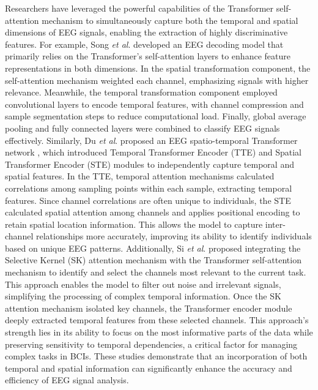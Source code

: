 \documentclass[preprint,12pt]{elsarticle}
\newcommand{\etal}{\textit{et al}. }
\begin{document}
Researchers have leveraged the powerful capabilities of the Transformer self-attention mechanism to simultaneously capture both the temporal and spatial dimensions of EEG signals, enabling the extraction of highly discriminative features. For example, Song \etal \cite{song2021transformer} developed an EEG decoding model that primarily relies on the Transformer’s self-attention layers to enhance feature representations in both dimensions. In the spatial transformation component, the self-attention mechanism weighted each channel, emphasizing signals with higher relevance. Meanwhile, the temporal transformation component employed convolutional layers to encode temporal features, with channel compression and sample segmentation steps to reduce computational load. Finally, global average pooling and fully connected layers were combined to classify EEG signals effectively. Similarly, Du \etal proposed an EEG spatio-temporal Transformer network \cite{du2022eeg}, which introduced Temporal Transformer Encoder (TTE) and Spatial Transformer Encoder (STE) modules to independently capture temporal and spatial features. In the TTE, temporal attention mechanisms calculated correlations among sampling points within each sample, extracting temporal features. Since channel correlations are often unique to individuals, the STE calculated spatial attention among channels and applies positional encoding to retain spatial location information. This allows the model to capture inter-channel relationships more accurately, improving its ability to identify individuals based on unique EEG patterns. Additionally, Si \etal \cite{si2023temporal} proposed integrating the Selective Kernel (SK) attention mechanism with the Transformer self-attention mechanism to identify and select the channels most relevant to the current task. This approach enables the model to filter out noise and irrelevant signals, simplifying the processing of complex temporal information. Once the SK attention mechanism isolated key channels, the Transformer encoder module deeply extracted temporal features from these selected channels. This approach's strength lies in its ability to focus on the most informative parts of the data while preserving sensitivity to temporal dependencies, a critical factor for managing complex tasks in BCIs. These studies demonstrate that an incorporation of both temporal and spatial information can significantly enhance the accuracy and efficiency of EEG signal analysis.
\end{document}
